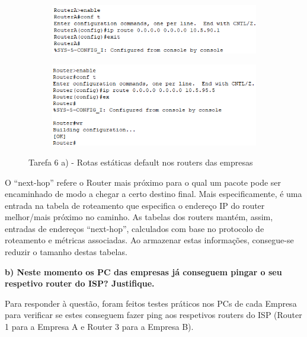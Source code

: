 \documentclass[11pt,english, openright, oneside]{book}
\begin{document}
\begin{figure}[h]
    \centering
    \begin{subfigure}{.5\textwidth}
        \centering
        \includegraphics[width=0.99\linewidth]{imagens/Tarefa6/6.a_RouterA.png}
    \end{subfigure}%
    \begin{subfigure}{.5\textwidth}
        \centering
        \includegraphics[width=0.99\linewidth]{imagens/Tarefa6/6.a_RouterB.png}
    \end{subfigure}
    \caption{Tarefa 6 a) - Rotas estáticas default nos routers das empresas}
    \label{fig:6.a}
\end{figure}
\vspace{0.2cm}

O “next-hop” refere o Router mais próximo para o qual um pacote pode ser encaminhado de modo a chegar a certo destino final. Mais especificamente, é uma entrada na tabela de roteamento que especifica o endereço IP do router melhor/mais próximo no caminho. As tabelas dos routers mantém,
assim, entradas de endereços “next-hop”, calculados com base no protocolo de roteamento e métricas associadas. Ao armazenar estas informações, consegue-se reduzir o tamanho destas tabelas.


\vspace{0.8cm}

\pagebreak
\textbf{b) Neste momento os PC das empresas já conseguem pingar o seu respetivo router do ISP? Justifique.}
\vspace{0.2cm}

Para responder à questão, foram feitos testes práticos nos PCs de cada Empresa para verificar se estes conseguem fazer ping aos respetivos routers do ISP (Router 1 para a Empresa A e Router 3 para a Empresa B). \par \vspace{0.4cm}
\end{document}
